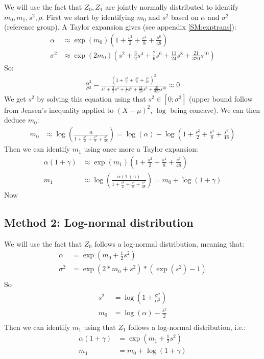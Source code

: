 \documentclass[12pt]{article}
\begin{document}
We will use the fact that \(Z_0,Z_1\) are jointly normally distributed
to identify \(m_0,m_1,s^2,\rho\). First we start by identifying
\(m_0\) and \(s^2\) based on \(\alpha\) and \(\sigma^2\) (reference
group). A Taylor expansion gives (see appendix \ref{SM:exptrans}):
\begin{align*}
\alpha &\approx \exp(m_0)\left(1 + \frac{s^2}{2}+\frac{s^4}{8}+\frac{s^6}{48}\right) \\
\sigma^2 &\approx \exp(2 m_0)\left(s^2 + \frac{3}{2} s^4 + \frac{7}{6} s^6 + \frac{11}{24} s^8 + \frac{21}{320} s^{10}\right)
\end{align*}
So:
\begin{align*}
\frac{\alpha^2}{\sigma^2} - \frac{\left(1 + \frac{s^2}{2}+\frac{s^4}{8}+\frac{s^6}{48}\right)^2}{s^2 + \frac{3}{2} s^4 + \frac{7}{6} s^6 + \frac{11}{24} s^8 + \frac{21}{320} s^{10}} \approx 0
\end{align*}
We get \(s^2\) by solving this equation using that \(s^2 \in
[0;\sigma^2]\) (upper bound follow from Jensen's inequality applied to
\((X-\mu)^2\), \(\log\) being concave). We can then deduce \(m_0\):
\begin{align*}
m_0  &\approx \log\left(\frac{\alpha}{1 + \frac{s^2}{2}+\frac{s^4}{8}+\frac{s^6}{48}}\right) = \log(\alpha) - \log\left(1 + \frac{s^2}{2}+\frac{s^4}{8}+\frac{s^6}{48}\right)
\end{align*}
Then we can identify \(m_1\) using once more a Taylor expansion:
\begin{align*}
\alpha(1+\gamma) &\approx \exp(m_1)\left(1 + \frac{s^2}{2}+\frac{s^4}{8}+\frac{s^6}{48}\right) \\
m_1 &\approx \log\left(\frac{\alpha(1+\gamma)}{1 + \frac{s^2}{2}+\frac{s^4}{8}+\frac{s^6}{48}}\right) = m_0 + \log(1+\gamma)
\end{align*}
Now

\subsection{Method 2: Log-normal distribution}
\label{sec:org173cc71}
We will use the fact that \(Z_0\) follows a log-normal distribution,
meaning that:
\begin{align*}
\alpha &= \exp(m_0 + \frac{1}{2} s^2) \\
\sigma^2 &= \exp(2*m_0 + s^2)*(\exp(s^2)-1) \\
\end{align*}
So
\begin{align*}
s^2 &= \log\left(1+\frac{\sigma^2}{\alpha^2}\right)\\
m_0 &= \log(\alpha)-\frac{s^2}{2}\\
\end{align*}
Then we can identify \(m_1\) using that \(Z_1\) follows a log-normal distribution, i.e.:
\begin{align*}
\alpha(1+\gamma) &= \exp(m_1 + \frac{1}{2} s^2) \\
m_1 &= m_0+\log(1+\gamma)\\
\end{align*}
\end{document}
